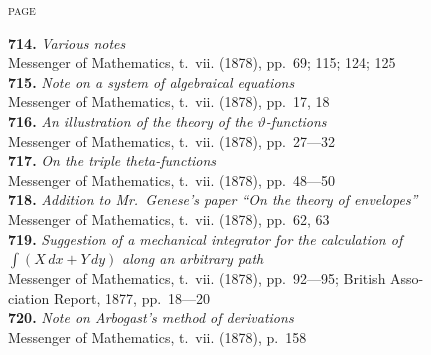 \documentclass[12pt,a4paper,oneside]{book}
\begin{document}
\clearpage

\vspace*{1em}

\hfill\textsc{page}

\small
\noindent\textbf{714.} \textit{Various notes} \\
\hspace*{2em}Messenger of Mathematics, t.~vii. (1878), pp.~69; 115; 124; 125\\[0.4em]
\textbf{715.} \textit{Note on a system of algebraical equations} \\
\hspace*{2em}Messenger of Mathematics, t.~vii. (1878), pp.~17, 18\\[0.4em]
\textbf{716.} \textit{An illustration of the theory of the $\vartheta$-functions} \\
\hspace*{2em}Messenger of Mathematics, t.~vii. (1878), pp.~27---32\\[0.4em]
\textbf{717.} \textit{On the triple theta-functions} \\
\hspace*{2em}Messenger of Mathematics, t.~vii. (1878), pp.~48---50\\[0.4em]
\textbf{718.} \textit{Addition to Mr.~Genese's paper ``On the theory of envelopes''} \\
\hspace*{2em}Messenger of Mathematics, t.~vii. (1878), pp.~62, 63\\[0.4em]
\textbf{719.} \textit{Suggestion of a mechanical integrator for the calculation of}\\
\hspace*{2em}$\int(X\,dx + Y\,dy)$ \textit{along an arbitrary path} \\
\hspace*{2em}Messenger of Mathematics, t.~vii. (1878), pp.~92---95; British Asso-\\
\hspace*{2em}ciation Report, 1877, pp.~18---20\\[0.4em]
\textbf{720.} \textit{Note on Arbogast's method of derivations} \\
\hspace*{2em}Messenger of Mathematics, t.~vii. (1878), p.~158\\[0.4em]
\end{document}
